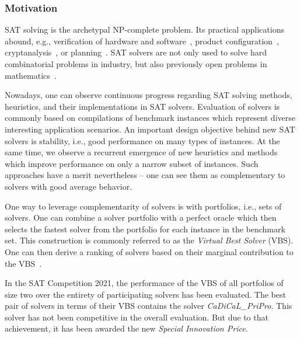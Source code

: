 \documentclass[runningheads]{llncs}
\begin{document}
\subsubsection{Motivation}

SAT solving is the archetypal NP-complete problem.
Its practical applications abound, e.g., verification of hardware and software~\cite{Kaufmann:2021:Amulet,Buning:2020:QPRVerify}, product configuration~\cite{Janota:2014:Configuration}, cryptanalysis~\cite{Nejati:2020:CDCLCrypto}, or planning~\cite{Schreiber:2021:Lilotane}.
SAT solvers are not only used to solve hard combinatorial problems in industry, but also previously open problems in mathematics~\cite{Heule:2016:Pyth,Heule:2018:Schur}. 

Nowadays, one can observe continuous progress regarding SAT solving methods, heuristics, and their implementations in SAT solvers. 
Evaluation of solvers is commonly based on compilations of benchmark instances which represent diverse interesting application scenarios. 
An important design objective behind new SAT solvers is stability, i.e., good performance on many types of instances. 
At the same time, we observe a recurrent emergence of new heuristics and methods which improve performance on only a narrow subset of instances. 
Such approaches have a merit nevertheless -- one can see them as complementary to solvers with good average behavior. 

One way to leverage complementarity of solvers is with portfolios, i.e., sets of solvers.
One can combine a solver portfolio with a perfect oracle which then selects the fastest solver from the portfolio for each instance in the benchmark set. 
This construction is commonly referred to as the \emph{Virtual Best Solver} (VBS). 
One can then derive a ranking of solvers based on their marginal contribution to the VBS~\cite{Xu:2012:EvalContribVBS}. 

\begin{example}
In the SAT Competition 2021, the performance of the VBS of all portfolios of size two over the entirety of participating solvers has been evaluated. 
The best pair of solvers in terms of their VBS contains the solver \emph{CaDiCaL\_PriPro}.
This solver has not been competitive in the overall evaluation.
But due to that achievement, it has been awarded the new \emph{Special Innovation Price}.
\end{example}
\end{document}
